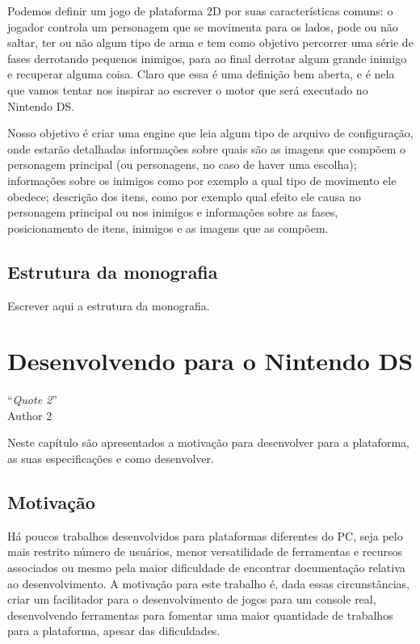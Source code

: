 \documentclass[brazil]{abnt}
\begin{document}
Podemos definir um jogo de plataforma 2D por suas características comuns: o jogador controla um personagem que se movimenta para os lados, pode ou não saltar, ter ou não algum tipo de arma e tem como objetivo percorrer uma série de fases derrotando pequenos inimigos, para ao final derrotar algum grande inimigo e recuperar alguma coisa. Claro que essa é uma definição bem aberta, e é nela que vamos tentar nos inspirar ao escrever o motor que será executado no Nintendo DS.

Nosso objetivo é criar uma engine que leia algum tipo de arquivo de configuração, onde estarão detalhadas informações sobre quais são as imagens que compõem o personagem principal (ou personagens, no caso de haver uma escolha); informações sobre os inimigos como por exemplo a qual tipo de movimento ele obedece; descrição dos itens, como por exemplo qual efeito ele causa no personagem principal ou nos inimigos e informações sobre as fases, posicionamento de itens, inimigos e as imagens que as compõem.

\section{Estrutura da monografia}

Escrever aqui a estrutura da monografia.

\chapter{Desenvolvendo para o Nintendo DS\label{cap:hardds}}

\vfill{}
\begin{flushright}{}``\emph{Quote 2}''\\
{\small Author 2}\end{flushright}{\small \par}
\vfill{}

Neste capítulo são apresentados a motivação para desenvolver para a plataforma, as suas especificações e como desenvolver.
\newpage

\section{Motivação}

Há poucos trabalhos desenvolvidos para plataformas diferentes do PC, seja pelo mais restrito número de usuários, menor versatilidade de ferramentas e recursos associados ou mesmo pela maior dificuldade de encontrar documentação relativa ao desenvolvimento. A motivação para este trabalho é, dada essas circunstâncias, criar um facilitador para o desenvolvimento de jogos para um console real, desenvolvendo ferramentas para fomentar uma maior quantidade de trabalhos para a plataforma, apesar das dificuldades.
\end{document}
